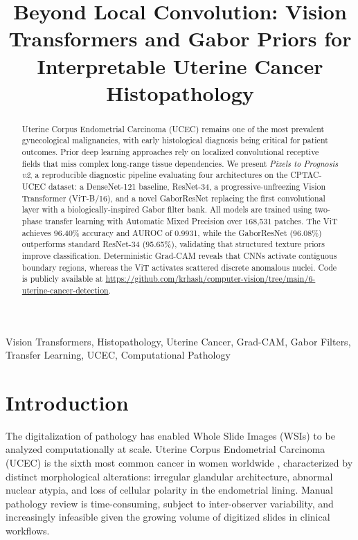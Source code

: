 \documentclass[conference]{IEEEtran}
\begin{document}
\title{Beyond Local Convolution: Vision Transformers and Gabor Priors for Interpretable Uterine Cancer Histopathology}

\author{
}

\maketitle

\begin{abstract}
Uterine Corpus Endometrial Carcinoma (UCEC) remains one of the most prevalent gynecological malignancies, with early histological diagnosis being critical for patient outcomes. Prior deep learning approaches rely on localized convolutional receptive fields that miss complex long-range tissue dependencies. We present \textit{Pixels to Prognosis v2}, a reproducible diagnostic pipeline evaluating four architectures on the CPTAC-UCEC dataset: a DenseNet-121 baseline, ResNet-34, a progressive-unfreezing Vision Transformer (ViT-B/16), and a novel GaborResNet replacing the first convolutional layer with a biologically-inspired Gabor filter bank. All models are trained using two-phase transfer learning with Automatic Mixed Precision over 168,531 patches. The ViT achieves 96.40\% accuracy and AUROC of 0.9931, while the GaborResNet (96.08\%) outperforms standard ResNet-34 (95.65\%), validating that structured texture priors improve classification. Deterministic Grad-CAM reveals that CNNs activate contiguous boundary regions, whereas the ViT activates scattered discrete anomalous nuclei. Code is publicly available at \url{https://github.com/krhash/computer-vision/tree/main/6-uterine-cancer-detection}.
\end{abstract}

\begin{IEEEkeywords}
Vision Transformers, Histopathology, Uterine Cancer, Grad-CAM, Gabor Filters, Transfer Learning, UCEC, Computational Pathology
\end{IEEEkeywords}

\section{Introduction}
The digitalization of pathology has enabled Whole Slide Images (WSIs) to be analyzed computationally at scale. Uterine Corpus Endometrial Carcinoma (UCEC) is the sixth most common cancer in women worldwide \cite{b4}, characterized by distinct morphological alterations: irregular glandular architecture, abnormal nuclear atypia, and loss of cellular polarity in the endometrial lining. Manual pathology review is time-consuming, subject to inter-observer variability, and increasingly infeasible given the growing volume of digitized slides in clinical workflows.
\end{document}

